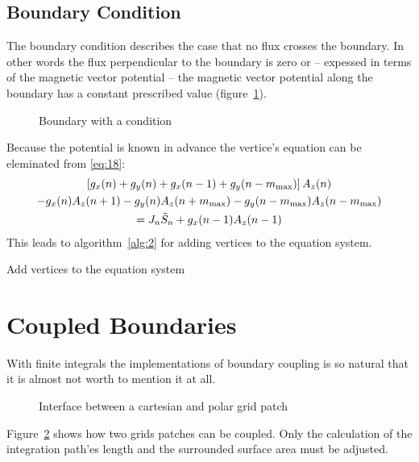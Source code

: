 \subsection{ Boundary Condition}
\label{sec:dirichlet}

The  boundary condition describes the case that no flux
crosses the boundary.  In other words the flux perpendicular to the
boundary is zero or -- expessed in terms of the magnetic vector
potential -- the magnetic vector potential along the boundary has a
constant prescribed value (figure~\ref{fig:diri-condition}).
\begin{figure}
  \centering
  
  \caption{Boundary with a  condition}
  \label{fig:diri-condition}
\end{figure}
 Because the potential is known in advance
the vertice's equation can be eleminated from \eqref{eq:18}:
\begin{multline}
  \left[g_x(n)+g_y(n)+g_x(n-1)+g_y(n-m_{\text{max}})\right]A_z(n) \\
  -g_x(n)A_z(n+1)-g_y(n)A_z(n+m_{\text{max}})-g_y(n-m_{\text{max}})A_z(n-m_{\text{max}}) \\
  = J_n\tilde{S}_n+g_x(n-1)A_z(n-1)
\end{multline}
This leads to algorithm~\ref{alg:2} for adding 
vertices to the equation system.
\begin{algorithm}
  \caption{Add  vertices to the equation system}
  \label{alg:2}
\end{algorithm}

\section{Coupled Boundaries}
\label{sec:coupled-boundaries}

With finite integrals the implementations of boundary coupling is so
natural that it is almost not worth to mention it at all.
\begin{figure}
  \centering
  
  \caption{Interface between a cartesian and polar grid patch}
  \label{fig:polar-cartesian}
\end{figure}
Figure~\ref{fig:polar-cartesian} shows how two grids patches can be
coupled.  Only the calculation of the integration path'es length and
the surrounded surface area must be adjusted.  



